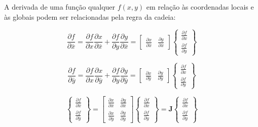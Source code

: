         A derivada de uma função qualquer $f(x,y)$ em relação às coordenadas locais e às globais podem ser relacionadas pela regra da cadeia:

        \begin{equation*}
            \frac{\partial f}{\partial \bar{x}} = 
            \frac{\partial f}{\partial x} \frac{\partial x}{\partial \bar{x}} + 
            \frac{\partial f}{\partial y} \frac{\partial y}{\partial \bar{x}} =
            \begin{bmatrix}
                \frac{\partial x}{\partial \bar{x}} &
                \frac{\partial y}{\partial \bar{x}}
            \end{bmatrix}
            \begin{Bmatrix}
                \frac{\partial f}{\partial x} \\
                \frac{\partial f}{\partial y}
            \end{Bmatrix}
        \end{equation*}

        \begin{equation*}
            \frac{\partial f}{\partial \bar{y}} = 
            \frac{\partial f}{\partial x} \frac{\partial x}{\partial \bar{y}} + 
            \frac{\partial f}{\partial y} \frac{\partial y}{\partial \bar{y}} =
            \begin{bmatrix}
                \frac{\partial x}{\partial \bar{y}} &
                \frac{\partial y}{\partial \bar{y}}
            \end{bmatrix}
            \begin{Bmatrix}
                \frac{\partial f}{\partial x} \\
                \frac{\partial f}{\partial y}
            \end{Bmatrix}
        \end{equation*}

        \begin{equation}
            \begin{Bmatrix}
                \frac{\partial f}{\partial \bar{x}} \\
                \frac{\partial f}{\partial \bar{y}}
            \end{Bmatrix} =
            \begin{bmatrix}
                \frac{\partial x}{\partial \bar{x}} & \frac{\partial y}{\partial \bar{x}}\\
                \frac{\partial x}{\partial \bar{y}} & \frac{\partial y}{\partial \bar{y}}
            \end{bmatrix}
            \begin{Bmatrix}
                \frac{\partial f}{\partial x} \\
                \frac{\partial f}{\partial y}
            \end{Bmatrix}
            = \mathbf{J}
            \begin{Bmatrix}
                \frac{\partial f}{\partial x} \\
                \frac{\partial f}{\partial y}
            \end{Bmatrix}
        \end{equation}
        

